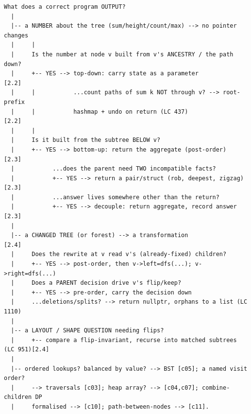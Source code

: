 \begin{lstlisting}[language={}, basicstyle=\ttfamily\small, numbers=none, frame=single]
  What does a correct program OUTPUT?
  |
  |-- a NUMBER about the tree (sum/height/count/max) --> no pointer changes
  |     |
  |     Is the number at node v built from v's ANCESTRY / the path down?
  |     +-- YES --> top-down: carry state as a parameter               [2.2]
  |     |           ...count paths of sum k NOT through v? --> root-prefix
  |     |           hashmap + undo on return (LC 437)                   [2.2]
  |     |
  |     Is it built from the subtree BELOW v?
  |     +-- YES --> bottom-up: return the aggregate (post-order)        [2.3]
  |           ...does the parent need TWO incompatible facts?
  |           +-- YES --> return a pair/struct (rob, deepest, zigzag)   [2.3]
  |           ...answer lives somewhere other than the return?
  |           +-- YES --> decouple: return aggregate, record answer     [2.3]
  |
  |-- a CHANGED TREE (or forest) --> a transformation                   [2.4]
  |     Does the rewrite at v read v's (already-fixed) children?
  |     +-- YES --> post-order, then v->left=dfs(...); v->right=dfs(...)
  |     Does a PARENT decision drive v's flip/keep?
  |     +-- YES --> pre-order, carry the decision down
  |     ...deletions/splits? --> return nullptr, orphans to a list (LC 1110)
  |
  |-- a LAYOUT / SHAPE QUESTION needing flips?
  |     +-- compare a flip-invariant, recurse into matched subtrees (LC 951)[2.4]
  |
  |-- ordered lookups? balanced by value? --> BST [c05]; a named visit order?
  |     --> traversals [c03]; heap array? --> [c04,c07]; combine-children DP
  |     formalised --> [c10]; path-between-nodes --> [c11].
\end{lstlisting}


